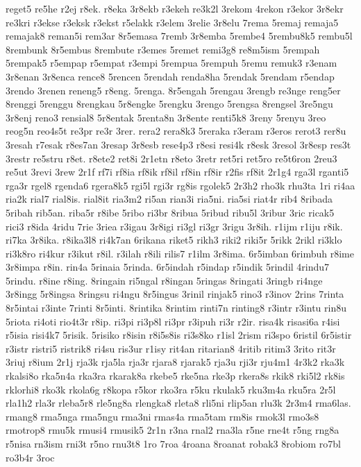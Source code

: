 {reget5 re5he r2ej r8ek. r8eka 3r8ekb r3ekeh re3k2l 3rekom 4rekon r3ekor
3r8ekr re3kri r3ekse r3eksk r3ekst r5elakk r3elem 3relie 3r8elu 7rema
5remaj remaja5 remajak8 reman5i rem3ar 8r5emasa 7remb 3r8emba 5rembe4
5rembu8k5 rembu5l 8rembunk 8r5embus 8rembute r3emes 5remet remi3g8
re8m5ism 5rempah 5rempak5 r5empap r5empat r3empi 5rempua 5rempuh 5remu
remuk3 r3enam 3r8enan 3r8enca rence8 5rencen 5rendah renda8ha 5rendak
5rendam r5endap 3rendo 3renen reneng5 r8eng. 5renga. 8r5engah 5rengau
3rengb re3nge reng5er 8renggi 5renggu 8rengkau 5r8engke 5rengku 3rengo
5rengsa 8rengsel 3re5ngu 3r8enj reno3 rensial8 5r8entak 5renta8n 3r8ente
renti5k8 3reny 5renyu 3reo reog5n reo4s5t re3pr re3r 3rer. rera2 rera8k3
5reraka r3eram r3eros rerot3 rer8u 3resah r7esak r8es7an 3resap 3r8esb
rese4p3 r8esi resi4k r8esk 3resol 3r8esp res3t 3restr re5stru r8et. r8ete2
ret8i 2r1etn r8eto 3retr ret5ri ret5ro re5t6ron 2reu3 re5ut 3revi 3rew
2r1f rf7i rf8ia rf8ik rf8il rf8in rf8ir r2fis rf8it 2r1g4 rga3l rganti5
rga3r rgel8 rgenda6 rgera8k5 rgi5l rgi3r rg8is rgolek5 2r3h2 rho3k rhu3ta
1ri ri4aa ria2k rial7 rial8is. rial8it ria3m2 ri5an rian3i ria5ni. ria5si
riat4r rib4 8ribada 5ribah rib5an. riba5r r8ibe 5ribo ri3br 8ribua 5ribud
ribu5l 3ribur 3ric ricak5 rici3 r8ida 4ridu 7rie 3riea r3igau 3r8igi ri3gl
ri3gr 3rigu 3r8ih. r1ijm r1iju r8ik. ri7ka 3r8ika. r8ika3l8 ri4k7an
6rikana riket5 rikh3 riki2 riki5r 5rikk 2rikl ri3klo ri3k8ro ri4kur r3ikut
r8il. r3ilah r8ili rilis7 r1ilm 3r8ima. 6r5imban 6rimbuh r8ime 3r8impa
r8in. rin4a 5rinaia 5rinda. 6r5indah r5indap r5indik 5rindil 4rindu7
5rindu. r8ine r8ing. 8ringain ri5ngal r8ingan 5ringas 8ringati 3ringb
ri4nge 3r8ingg 5r8ingsa 8ringsu ri4ngu 8r5ingus 3rinil rinjak5 rino3
r3inov 2rins 7rinta 8r5intai r3inte 7rinti 8r5inti. 8rintika 8rintim
rinti7n rinting8 r3intr r3intu rin8u 5riota ri4oti rio4t3r r8ip. ri3pi
ri3p8l ri3pr r3ipuh ri3r r2ir. risa4k risasi6a r4isi r5isia risi4k7
5risik. 5risiko r8isin r8i5s8is ri3s8ko r1isl 2rism ri3spo 6ristil
6r5istir r3istr ristri5 ristrik8 ri4su ris3ur r1isy rit4an ritarian8
4ritib ritim3 3rito rit3r 3riuj r8ium 2r1j rja3k rja5la rja3r rjara8
rjarak5 rja3u rji3r rju4m1 4r3k2 rka3k rkalsi8o rka5n4a rka3ra rkarak8a
rkebe5 rke5na rke3p rkera8s rkik8 rki5l2 rk8is rklorhi8 rko3k rkola6g
r8kopa r5kor rko3ra r5ku rkulak5 rku3m4a rku5ra 2r5l rla1h2 rla3r rleba5r8
rle5ng8a rlengka8 rleta8 rli5ni rlip5an rlu3k 2r3m4 rma6las. rmang8
rma5nga rma5ngu rma3ni rmas4a rma5tam rm8is rmok3l rmo3s8 rmotrop8 rmu5k
rmusi4 rmusik5 2r1n r3na rnal2 rna3la r5ne rne4t r5ng rng8a r5nisa rn3ism
rni3t r5no rnu3t8 1ro 7roa 4roana 8roanat robak3 8robiom ro7bl ro3b4r 3roc
}
